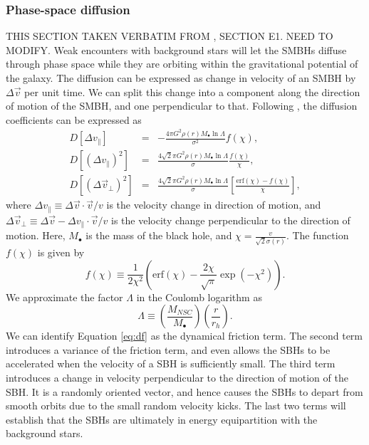\documentclass[fleqn,usenatbib,useAMS]{mnras}
\begin{document}
\subsubsection{Phase-space diffusion} \label{psd}
THIS SECTION TAKEN VERBATIM FROM \citet{2017MNRAS.467.4180S}, SECTION E1.  NEED TO MODIFY.
Weak encounters with background stars will let the SMBHs diffuse through phase space while they are orbiting within the gravitational potential of the galaxy. The diffusion can be expressed as change in velocity of an SMBH by $\Delta \vec{v}$ per unit time. We can split this change into a component along the direction of motion of the SMBH, and one perpendicular to that. Following \citet{2008gady.book.....B}, the diffusion coefficients can be expressed as 
\begin{eqnarray}\label{eq:df}
D[\Delta v_\parallel] & = & -\frac{4\pi G^2\rho(r)M_\bullet\ln\Lambda}{\sigma^2}f(\chi),\\
D[(\Delta v_\parallel)^2] & = & \frac{4\sqrt{2}\pi G^2\rho(r)M_\bullet\ln\Lambda}{\sigma}\frac{f(\chi)}{\chi},\\
D[(\Delta \vec{v}_\bot)^2] & = & \frac{4\sqrt{2}\pi G^2\rho(r)M_\bullet\ln\Lambda}{\sigma}\left[\frac{\mbox{erf}(\chi)-f(\chi)}{\chi}\right],
\end{eqnarray} 
where $\Delta v_\parallel \equiv \Delta \vec{v}\cdot\vec{v}/v$ is the velocity change in direction of motion, and $\Delta \vec{v}_\bot \equiv \Delta \vec{v} - \Delta v_\parallel \cdot\vec{v}/v$ is the velocity change perpendicular to the direction of motion. Here, $M_\bullet$ is the mass of the black hole, and $\chi = \frac{v}{\sqrt{2}\sigma(r)}$. The function $f(\chi)$ is given by 
\begin{equation}
f(\chi) \equiv \frac{1}{2\chi^2}\left(\mbox{erf}(\chi)-\frac{2\chi}{\sqrt{\pi}}\exp\left(-\chi^2\right)\right).
\end{equation}
We approximate the factor $\Lambda$ in the Coulomb logarithm as
\begin{equation}
\Lambda \equiv \left(\frac{M_{NSC}}{M_\bullet}\right)\left(\frac{r}{r_h}\right).
\end{equation}
We can identify Equation \ref{eq:df} as the dynamical friction term. The second term introduces a variance of the friction term, and even allows the SBHs to be accelerated when the velocity of a SBH is sufficiently small. The third term introduces a change in velocity perpendicular to the direction of motion of the SBH. It is a randomly oriented vector, and hence causes the SBHs to depart from smooth orbits due to the small random velocity kicks. The last two terms will establish that the SBHs are ultimately in energy equipartition with the background stars.
\end{document}
